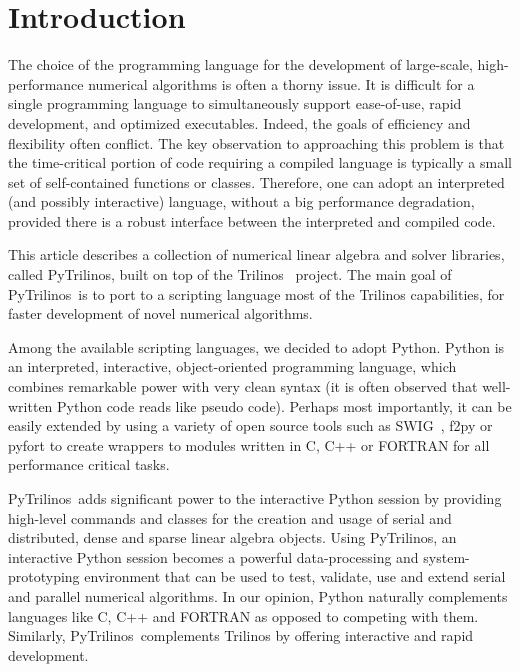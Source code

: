\documentclass{llncs}
\newcommand{\PyTrilinos}{{\sc PyTrilinos}}
\begin{document}
\section{Introduction}
\label{sec:intro}

The choice of the programming language for the development of
large-scale, high-performance numerical algorithms is often a thorny
issue.
It is difficult for a single programming
language to simultaneously support ease-of-use, rapid development, and
optimized executables.  Indeed, the goals of efficiency and
flexibility often conflict.  The key observation to approaching this
problem is that the time-critical portion of code requiring a compiled
language is typically a small set of self-contained functions or
classes.  Therefore, one can adopt an interpreted (and possibly
interactive) language, without a big performance degradation, provided
there is a robust interface between the interpreted and compiled code.

This article describes a collection of numerical linear algebra and
solver libraries, called \PyTrilinos, built on top of the
Trilinos~\cite{Trilinos-Overview}
project.  The main goal of \PyTrilinos\ is to port to a scripting
language most of the Trilinos capabilities, for faster development of novel
numerical algorithms.

Among the available scripting languages, we decided to adopt Python.  Python
is an interpreted, interactive, object-oriented programming language, which
combines remarkable power with very clean syntax (it is often observed that
well-written Python code reads like pseudo code).  Perhaps most importantly,
it can be easily extended by using a variety of open source tools such as
SWIG~\cite{swig}, f2py or pyfort to create wrappers to modules written in C, C++ or
FORTRAN for all performance critical tasks.

\PyTrilinos\ adds
significant power to the interactive Python session by providing
high-level commands and classes for the creation and usage of serial
and distributed, dense and sparse linear algebra objects.  Using
\PyTrilinos, an interactive Python session becomes a powerful
data-processing and system-prototyping environment that can be used to
test, validate, use and extend serial and parallel numerical
algorithms.  In our opinion, Python naturally complements languages
like C, C++ and FORTRAN as opposed to competing with them.  Similarly,
\PyTrilinos\ complements Trilinos by offering interactive and rapid
development.
\end{document}

